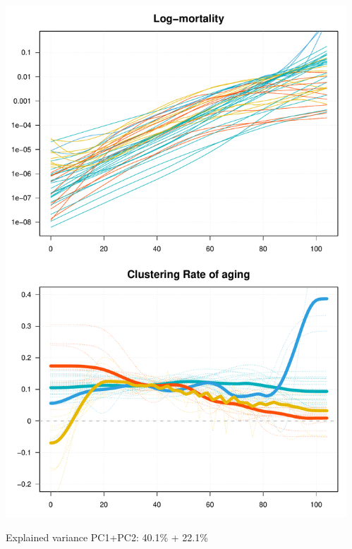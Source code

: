 \documentclass[table,xcdraw,dvipsnames]{beamer}
\begin{document}
\begin{frame}[fragile]
{\begin{columns}
\begin{column}{5cm}
				\includegraphics[scale=.23]{Figures/CombClust.pdf}
				\begin{tiny}
					Explained variance PC1+PC2: 40.1\% + 22.1\%
				\end{tiny}
			\end{column}
			\begin{column}{5cm}

\end{column}
\end{columns}}
\end{frame}
\end{document}
